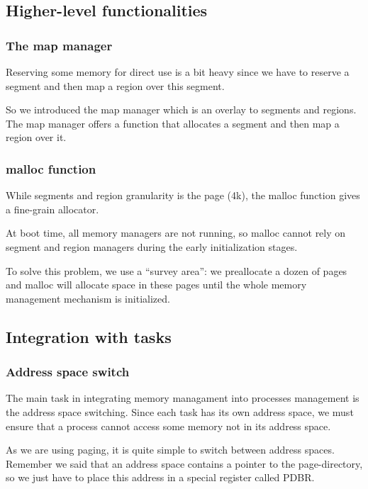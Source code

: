 \subsection{Higher-level functionalities}


\begin{frame}
  \frametitle{The map manager}

  Reserving some memory for direct use is a bit heavy since we have to
  reserve a segment and then map a region over this segment.

  \nl

  So we introduced the map manager which is an overlay to segments and
  regions. The map manager offers  a function that allocates a segment
  and then map a region over it.

\end{frame}


\begin{frame}
  \frametitle{malloc function}

  While segments and  region granularity is the page  (4k), the malloc
  function gives a fine-grain allocator.

  \nl

  At boot time, all memory  managers are not running, so malloc cannot
  rely on segment and  region managers during the early initialization
  stages.

  \nl

  To solve  this problem, we use  a ``survey area'':  we preallocate a
  dozen of pages  and malloc will allocate space  in these pages until
  the whole memory management mechanism is initialized.

\end{frame}

%
%

\subsection{Integration with tasks}


\begin{frame}
  \frametitle{Address space switch}

  The  main  task  in  integrating memory  managament  into  processes
  management is the  address space switching. Since each  task has its
  own address space, we must  ensure that a process cannot access some
  memory not in its address space.

  \nl

  As we are using paging, it is quite simple to switch between address
  spaces. Remember we said that an address space contains a pointer to
  the  page-directory, so  we just  have to  place this  address  in a
  special register called PDBR.

\end{frame}

